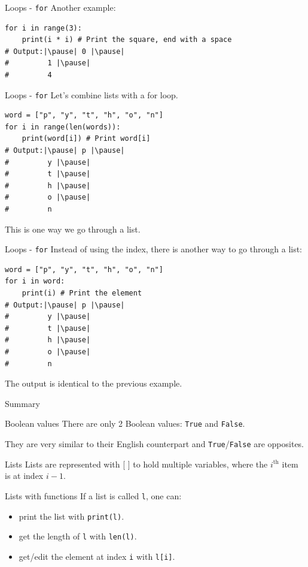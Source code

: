\documentclass[dvipsnames, svgnames, x11names, handout]{beamer}
\begin{document}
\begin{frame}[fragile]{Loops - \texttt{for}}
Another example:
\begin{verbatim}
for i in range(3):
    print(i * i) # Print the square, end with a space
# Output:|\pause| 0 |\pause|
#         1 |\pause|
#         4
\end{verbatim}
\end{frame}

\begin{frame}[fragile]{Loops - \texttt{for}}
Let's combine lists with a for loop.
\begin{verbatim}
word = ["p", "y", "t", "h", "o", "n"]
for i in range(len(words)):
    print(word[i]) # Print word[i]
# Output:|\pause| p |\pause|
#         y |\pause|
#         t |\pause|
#         h |\pause|
#         o |\pause|
#         n
\end{verbatim}
\pause This is one way we go through a list.
\end{frame}

\begin{frame}[fragile]{Loops - \texttt{for}}
Instead of using the index, there is another way to go through a list:
\begin{verbatim}
word = ["p", "y", "t", "h", "o", "n"]
for i in word:
    print(i) # Print the element
# Output:|\pause| p |\pause|
#         y |\pause|
#         t |\pause|
#         h |\pause|
#         o |\pause|
#         n
\end{verbatim}
\pause The output is identical to the previous example.
\end{frame}

\begin{frame}[fragile]{Summary}
\begin{block}{Boolean values}
There are only 2 Boolean values: \texttt{True} and \texttt{False}.

They are very similar to their English counterpart and \texttt{True}/\texttt{False} are opposites.
\end{block}
\begin{block}{Lists}
Lists are represented with [ ] to hold multiple variables, where the $i^{\text{th}}$ item is at index $i - 1$.\\
\end{block}
\begin{block}{Lists with functions}
If a list is called \texttt{l}, one can:
\begin{itemize}
    \item print the list with \texttt{print(l)}.
    \item get the length of \texttt{l} with \texttt{len(l)}.
    \item get/edit the element at index \texttt{i} with \texttt{l[i]}.
\end{itemize}
\end{block}
\end{frame}
\end{document}
